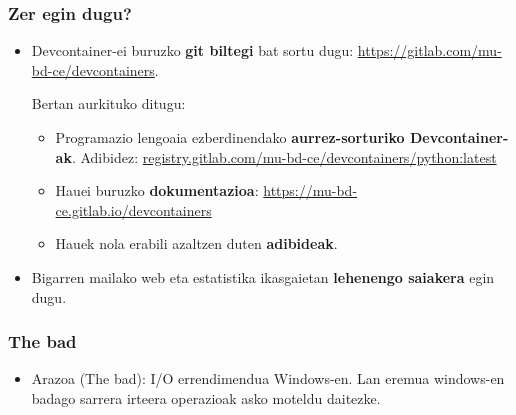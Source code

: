 \documentclass[lang=eu,biz=pls,aspectratio=169,handout]{mupresentation}
\begin{document}
\begin{frame}
  \frametitle{Zer egin dugu?}
  \begin{itemize}
    \item Devcontainer-ei buruzko \textbf{git biltegi} bat sortu dugu:
      \url{https://gitlab.com/mu-bd-ce/devcontainers}.

      Bertan aurkituko ditugu:
      \begin{itemize}
        \item Programazio lengoaia ezberdinendako \textbf{aurrez-sorturiko Devcontainer-ak}. Adibidez:
          \url{registry.gitlab.com/mu-bd-ce/devcontainers/python:latest}
        \item Hauei buruzko \textbf{dokumentazioa}:
          \url{https://mu-bd-ce.gitlab.io/devcontainers}
        \item Hauek nola erabili azaltzen duten \textbf{adibideak}.
      \end{itemize}
    \item Bigarren mailako web eta estatistika ikasgaietan \textbf{lehenengo saiakera} egin dugu.
  \end{itemize}
\end{frame}

\begin{frame}
  \frametitle{The bad}
  \begin{itemize}
    \item Arazoa (The bad): I/O errendimendua Windows-en. Lan eremua windows-en badago sarrera irteera operazioak asko moteldu daitezke.
  \end{itemize}
  \vspace{1em}
  \centering
\end{frame}
\end{document}
